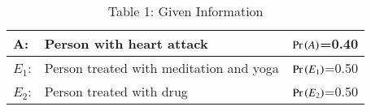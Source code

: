 \begin{table}[htbp]
\label{table:1}
\begin{tabular}{|l|l|l|}\hline
A:	&Person with heart attack	&$\Pr\left(A\right)$=0.40\\\hline
$E_1$:	&Person treated with meditation and yoga	&$\Pr\left(E_1\right)$=0.50\\\hline
$E_2$:	&Person treated with drug	&$\Pr\left(E_2\right)$=0.50\\\hline
\end{tabular}
\caption*{Table 1: Given Information}
\end{table}
